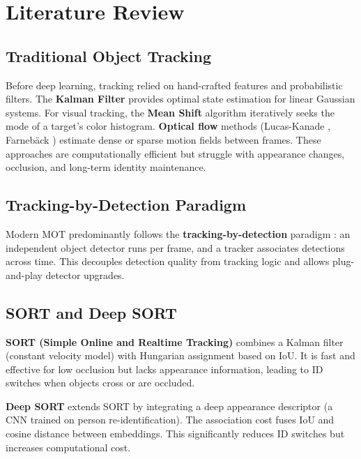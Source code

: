 \chapter{Literature Review}
\label{ch:literature}

\section{Traditional Object Tracking}
\label{sec:traditional-tracking}

Before deep learning, tracking relied on hand-crafted features and probabilistic filters. The \textbf{Kalman Filter} \cite{kalman1960new} provides optimal state estimation for linear Gaussian systems. For visual tracking, the \textbf{Mean Shift} algorithm \cite{comaniciu2002meanshift} iteratively seeks the mode of a target's color histogram. \textbf{Optical flow} methods (Lucas-Kanade \cite{lucas1981iterative}, Farnebäck \cite{farneback2003twoframe}) estimate dense or sparse motion fields between frames. These approaches are computationally efficient but struggle with appearance changes, occlusion, and long-term identity maintenance.

\section{Tracking-by-Detection Paradigm}
\label{sec:tracking-by-detection}

Modern MOT predominantly follows the \textbf{tracking-by-detection} paradigm \cite{bewley2016sort}: an independent object detector runs per frame, and a tracker associates detections across time. This decouples detection quality from tracking logic and allows plug-and-play detector upgrades.

\section{SORT and Deep SORT}
\label{sec:sort-deepsort}

\textbf{SORT (Simple Online and Realtime Tracking)} \cite{bewley2016sort} combines a Kalman filter (constant velocity model) with Hungarian assignment based on IoU. It is fast and effective for low occlusion but lacks appearance information, leading to ID switches when objects cross or are occluded.

\textbf{Deep SORT} \cite{wojke2017deepsort} extends SORT by integrating a deep appearance descriptor (a CNN trained on person re-identification). The association cost fuses IoU and cosine distance between embeddings. This significantly reduces ID switches but increases computational cost.

